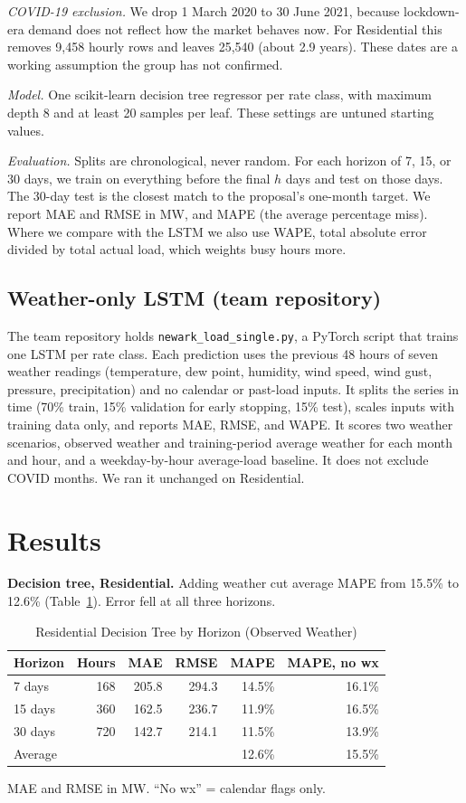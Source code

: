 \documentclass[conference]{IEEEtran}
\newcommand{\code}[1]{\texttt{#1}}
\begin{document}
\textit{COVID-19 exclusion.} We drop 1 March 2020 to 30 June 2021, because lockdown-era demand does not reflect how the market behaves now. For Residential this removes 9,458 hourly rows and leaves 25,540 (about 2.9 years). These dates are a working assumption the group has not confirmed.

\textit{Model.} One scikit-learn decision tree regressor \cite{sklearn} per rate class, with maximum depth 8 and at least 20 samples per leaf. These settings are untuned starting values.

\textit{Evaluation.} Splits are chronological, never random. For each horizon of 7, 15, or 30 days, we train on everything before the final $h$ days and test on those days. The 30-day test is the closest match to the proposal's one-month target. We report MAE and RMSE in MW, and MAPE (the average percentage miss). Where we compare with the LSTM we also use WAPE, total absolute error divided by total actual load, which weights busy hours more.

\subsection{Weather-only LSTM (team repository)}
The team repository holds \code{newark\_load\_single.py}, a PyTorch \cite{pytorch} script that trains one LSTM per rate class. Each prediction uses the previous 48 hours of seven weather readings (temperature, dew point, humidity, wind speed, wind gust, pressure, precipitation) and no calendar or past-load inputs. It splits the series in time (70\% train, 15\% validation for early stopping, 15\% test), scales inputs with training data only, and reports MAE, RMSE, and WAPE. It scores two weather scenarios, observed weather and training-period average weather for each month and hour, and a weekday-by-hour average-load baseline. It does not exclude COVID months. We ran it unchanged on Residential.

\section{Results}
\textbf{Decision tree, Residential.} Adding weather cut average MAPE from 15.5\% to 12.6\% (Table~\ref{tab:horizon}). Error fell at all three horizons.

\begin{table}[t]
\caption{Residential Decision Tree by Horizon (Observed Weather)}
\label{tab:horizon}
\centering\footnotesize
\setlength{\tabcolsep}{4pt}
\begin{tabular}{@{}lrrrrr@{}}
\toprule
Horizon & Hours & MAE & RMSE & MAPE & MAPE, no wx \\
\midrule
7 days & 168 & 205.8 & 294.3 & 14.5\% & 16.1\% \\
15 days & 360 & 162.5 & 236.7 & 11.9\% & 16.5\% \\
30 days & 720 & 142.7 & 214.1 & 11.5\% & 13.9\% \\
Average & & & & 12.6\% & 15.5\% \\
\bottomrule
\end{tabular}
\par\smallskip\noindent MAE and RMSE in MW. ``No wx'' = calendar flags only.
\end{table}
\end{document}
